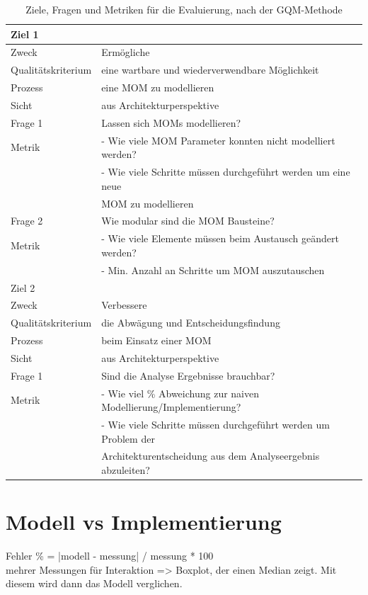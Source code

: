 \begin{table}
  \begin{tabular}{|l|l|}
    \hline
    \multicolumn{2}{|l|}{Ziel 1} \\
    \hline
    Zweck & Ermögliche \\
    Qualitätskriterium & eine wartbare und wiederverwendbare Möglichkeit  \\ 
    Prozess & eine MOM zu modellieren \\
    Sicht & aus Architekturperspektive \\
   
    \hline \hline
    Frage 1 & Lassen sich MOMs modellieren? \\
    \hline
    Metrik & - Wie viele MOM Parameter konnten nicht modelliert werden? \\
    & - Wie viele Schritte müssen durchgeführt werden um eine neue \\
    & MOM zu modellieren\\
    \hline\hline
    Frage 2 & Wie modular sind die MOM Bausteine? \\
    \hline
    Metrik & - Wie viele Elemente müssen beim Austausch geändert werden? \\
    & - Min. Anzahl an Schritte um MOM auszutauschen \\
    \hline\hline
    \multicolumn{2}{|l|}{Ziel 2} \\
    \hline
    Zweck & Verbessere \\
    Qualitätskriterium & die Abwägung und Entscheidungsfindung  \\ 
    Prozess & beim Einsatz einer MOM \\
    Sicht & aus Architekturperspektive \\
    \hline \hline
    Frage 1 & Sind die Analyse Ergebnisse brauchbar? \\
    \hline
    Metrik & - Wie viel \% Abweichung zur naiven Modellierung/Implementierung? \\
    & - Wie viele Schritte müssen durchgeführt werden um Problem der \\
    & Architekturentscheidung aus dem Analyseergebnis abzuleiten? \\
    \hline
  \end{tabular}
	\caption{\label{tab:gqm} Ziele, Fragen und Metriken für die Evaluierung, nach der GQM-Methode}
\end{table}

\section{Modell vs Implementierung}
Fehler \% = |modell - messung| / messung * 100 \\
mehrer Messungen für Interaktion => Boxplot, der einen Median zeigt. Mit diesem wird dann das Modell verglichen.
